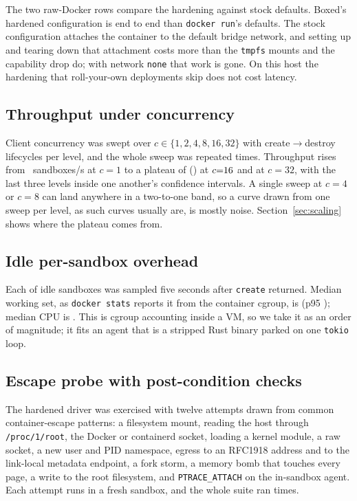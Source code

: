 \documentclass[conference]{IEEEtran}
\begin{document}
The two raw-Docker rows compare the hardening against stock defaults.
Boxed's hardened configuration is \HardeningDeltaMedian{}
\HardeningDeltaSign{} end to end than \texttt{docker run}'s defaults. The
stock configuration attaches the container to the default bridge network,
and setting up and tearing down that attachment costs more than the
\texttt{tmpfs} mounts and the capability drop do; with network
\texttt{none} that work is gone. On this host the hardening that
roll-your-own deployments skip does not cost latency.

\subsection{Throughput under concurrency}\label{sec:throughput}
Client concurrency was swept over $c \in \{1,2,4,8,16,32\}$ with
\BoxedTPPerLevel{} create$\rightarrow$destroy lifecycles per level, and the
whole sweep was repeated \BoxedTPRuns{} times. Throughput rises from
\BoxedTPatOne{}~sandboxes/s at $c{=}1$ to a plateau of \BoxedPeakRPS{}
(\BoxedPeakCI) at $c{=}16$ and \BoxedTPatThirtyTwo{} at
$c{=}32$, with the last three levels inside one another's confidence
intervals. A single sweep at $c{=}4$ or $c{=}8$ can land anywhere in a
two-to-one band, so a curve drawn from one sweep per level, as such curves
usually are, is mostly noise. Section~\ref{sec:scaling} shows where the
plateau comes from.

\subsection{Idle per-sandbox overhead}
Each of \BoxedOverheadN{} idle sandboxes was sampled five seconds after
\texttt{create} returned. Median working set, as \texttt{docker stats}
reports it from the container cgroup, is \BoxedRSSMedian{} (p95
\BoxedRSSPNinetyFive); median CPU is \BoxedCPUMedian{}. This is cgroup
accounting inside a VM, so we take it as an order of magnitude; it fits an
agent that is a stripped Rust binary parked on one \texttt{tokio} loop.


\subsection{Escape probe with post-condition checks}\label{sec:escape}
The hardened driver was exercised with twelve attempts drawn from common
container-escape patterns: a filesystem mount, reading the host through
\texttt{/proc/1/root}, the Docker or containerd socket, loading a kernel
module, a raw socket, a new user and PID namespace, egress to an RFC1918
address and to the link-local metadata endpoint, a fork storm, a memory
bomb that touches every page, a write to the root filesystem, and
\texttt{PTRACE\_ATTACH} on the in-sandbox agent. Each attempt runs in a
fresh sandbox, and the whole suite ran \BoxedEscapeRuns{} times.
\end{document}
